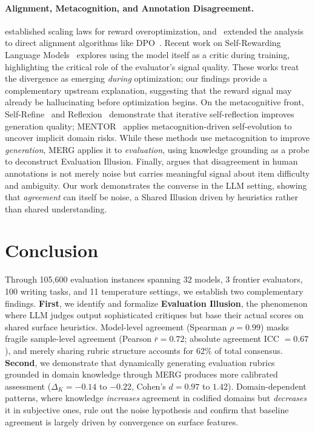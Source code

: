 \documentclass{article}
\begin{document}
\paragraph{Alignment, Metacognition, and Annotation Disagreement.}
\citet{gao2023scaling} established scaling laws for reward overoptimization, and~\citet{rafailov2024scaling} extended the analysis to direct alignment algorithms like DPO~\citep{rafailov2024direct}. Recent work on Self-Rewarding Language Models~\citep{yuan2024selfrewarding} explores using the model itself as a critic during training, highlighting the critical role of the evaluator's signal quality. These works treat the divergence as emerging \textit{during} optimization; our findings provide a complementary upstream explanation, suggesting that the reward signal may already be hallucinating before optimization begins. On the metacognitive front, Self-Refine~\citep{madaan2023selfrefine} and Reflexion~\citep{shinn2023reflexion} demonstrate that iterative self-reflection improves generation quality; MENTOR~\citep{shan2025mentor} applies metacognition-driven self-evolution to uncover implicit domain risks. While these methods use metacognition to improve \textit{generation}, MERG applies it to \textit{evaluation}, using knowledge grounding as a probe to deconstruct Evaluation Illusion. Finally, \citet{plank2022problem} argues that disagreement in human annotations is not merely noise but carries meaningful signal about item difficulty and ambiguity. Our work demonstrates the converse in the LLM setting, showing that \textit{agreement} can itself be noise, a Shared Illusion driven by heuristics rather than shared understanding.


\section{Conclusion}

Through 105,600 evaluation instances spanning 32 models, 3 frontier evaluators, 100 writing tasks, and 11 temperature settings, we establish two complementary findings. \textbf{First}, we identify and formalize \textbf{Evaluation Illusion}, the phenomenon where LLM judges output sophisticated critiques but base their actual scores on shared surface heuristics. Model-level agreement (Spearman $\rho = 0.99$) masks fragile sample-level agreement (Pearson $\bar{r} = 0.72$; absolute agreement ICC $= 0.67$), and merely sharing rubric structure accounts for 62\% of total consensus. \textbf{Second}, we demonstrate that dynamically generating evaluation rubrics grounded in domain knowledge through MERG produces more calibrated assessment ($\Delta_K = -0.14$ to $-0.22$, Cohen's $d = 0.97$ to $1.42$). Domain-dependent patterns, where knowledge \textit{increases} agreement in codified domains but \textit{decreases} it in subjective ones, rule out the noise hypothesis and confirm that baseline agreement is largely driven by convergence on surface features.
\end{document}
